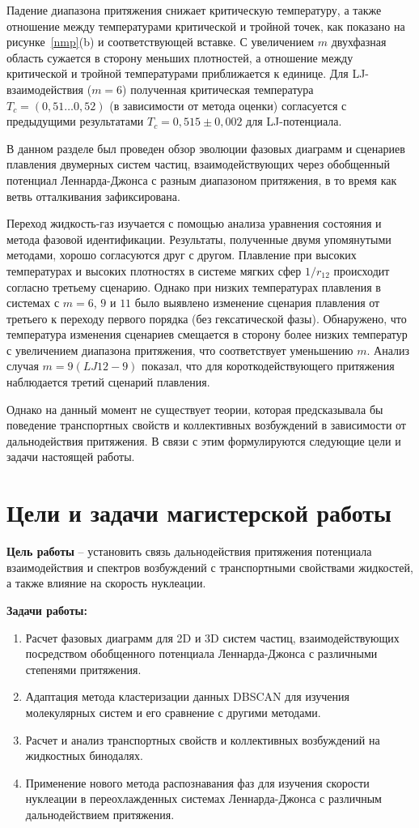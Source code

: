 Падение диапазона притяжения снижает критическую температуру, а также отношение между температурами критической и тройной точек, как показано на рисунке~\ref{nmp}(b) и соответствующей вставке.
С увеличением $m$ двухфазная область сужается в сторону меньших плотностей, а отношение между критической и тройной температурами приближается к единице.
Для LJ-взаимодействия ($m = 6$) полученная критическая температура $T_c=(0{,}51 \ldots 0{,}52)$ (в зависимости от метода оценки) согласуется с предыдущими результатами $T_c = 0{,}515 \pm 0{,}002$ для LJ-потенциала.

В данном разделе был проведен обзор эволюции фазовых диаграмм и сценариев плавления двумерных систем частиц, взаимодействующих через обобщенный потенциал Леннарда-Джонса с разным диапазоном притяжения, в то время как ветвь отталкивания зафиксирована.

Переход жидкость-газ изучается с помощью анализа уравнения состояния и метода фазовой идентификации.
Результаты, полученные двумя упомянутыми методами, хорошо согласуются друг с другом.
Плавление при высоких температурах и высоких плотностях в системе мягких сфер $1/r_{12}$ происходит согласно третьему сценарию. 
Однако при низких температурах плавления в системах с $m = 6$, $9$ и $11$ было выявлено изменение сценария плавления от третьего к переходу первого порядка (без гексатической фазы).
Обнаружено, что температура изменения сценариев смещается в сторону более низких температур с увеличением диапазона притяжения, что соответствует уменьшению $m$. 
Анализ случая $m = 9 (LJ12-9)$  показал, что для короткодействующего притяжения наблюдается третий сценарий плавления.

Однако на данный момент не существует теории, которая предсказывала бы поведение транспортных свойств и коллективных возбуждений в зависимости от дальнодействия притяжения.
В связи с этим формулируются следующие цели и задачи настоящей работы.

\section{Цели и задачи магистерской работы}

\textbf{Цель работы} -- установить связь дальнодействия притяжения потенциала взаимодействия и спектров возбуждений с транспортными свойствами жидкостей, а также влияние на скорость нуклеации.

\textbf{Задачи работы:}
\begin{enumerate}
\item Расчет фазовых диаграмм для 2D и 3D систем частиц, взаимодействующих посредством обобщенного потенциала Леннарда-Джонса с различными степенями притяжения.
\item Адаптация метода кластеризации данных DBSCAN для изучения молекулярных систем и его сравнение с другими методами.
\item Расчет и анализ транспортных свойств и коллективных возбуждений на жидкостных бинодалях.
\item Применение нового метода распознавания фаз для изучения скорости нуклеации в переохлажденных системах Леннарда-Джонса с различным дальнодействием притяжения.
\end{enumerate}
